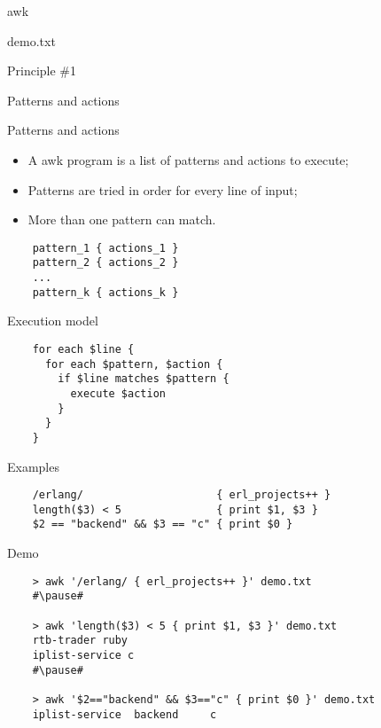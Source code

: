 \documentclass{beamer}
\renewcommand\big[1]{
  \begin{center}
    \Large{#1}
  \end{center}
}
\begin{document}
\begin{frame}
  \centering\Huge{awk}
\end{frame}

\begin{frame}
  \big{demo.txt}
  
\end{frame}

\begin{frame}
  \centering\Huge{Principle \#1}
  \big{Patterns and actions}
\end{frame}

\begin{frame}[fragile]
  \big{Patterns and actions}

  \begin{itemize}
    \item A awk program is a list of patterns and actions to execute;
    \item Patterns are tried in order for every line of input;
    \item More than one pattern can match.
  \end{itemize}

  \begin{lstlisting}
    pattern_1 { actions_1 }
    pattern_2 { actions_2 }
    ...
    pattern_k { actions_k }
  \end{lstlisting}
\end{frame}

\begin{frame}[fragile]
  \big{Execution model}

  \begin{lstlisting}
    for each $line {
      for each $pattern, $action {
        if $line matches $pattern {
          execute $action
        }
      }
    }
  \end{lstlisting}
\end{frame}

\begin{frame}[fragile]
  \big{Examples}
  \begin{lstlisting}
    /erlang/                     { erl_projects++ }
    length($3) < 5               { print $1, $3 }
    $2 == "backend" && $3 == "c" { print $0 }
  \end{lstlisting}
\end{frame}

\begin{frame}[fragile]
  \big{Demo}
  \begin{lstlisting}
    > awk '/erlang/ { erl_projects++ }' demo.txt
    #\pause#

    > awk 'length($3) < 5 { print $1, $3 }' demo.txt
    rtb-trader ruby
    iplist-service c
    #\pause#

    > awk '$2=="backend" && $3=="c" { print $0 }' demo.txt
    iplist-service  backend     c
  \end{lstlisting}
\end{frame}
\end{document}

